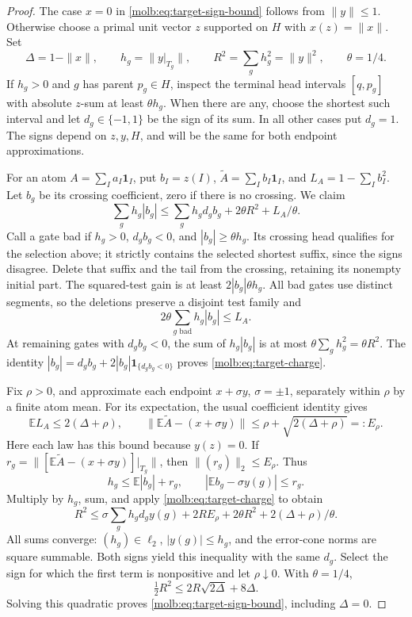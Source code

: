 \begin{proof}
The case \(x=0\) in \eqref{molb:eq:target-sign-bound} follows from
\(\|y\|\le1\).  Otherwise choose a primal unit vector \(z\)
supported on \(H\) with \(x(z)=\|x\|\).  Set
\[
 \Delta=1-\|x\|,\qquad h_g=\|y|_{T_g}\|,\qquad
 R^2=\sum_gh_g^2=\|y\|^2,\qquad\theta=1/4.
\]
If \(h_g>0\) and \(g\) has parent \(p_g\in H\), inspect the terminal
head intervals \([q,p_g]\) with absolute \(z\)-sum at least
\(\theta h_g\).  When there are any, choose the shortest such interval
and let \(d_g\in\{-1,1\}\) be the sign of its sum.  In all other cases
put \(d_g=1\).  The signs depend on \(z,y,H\), and will be the same
for both endpoint approximations.

For an atom \(A=\sum_Ia_I\mathbf1_I\), put \(b_I=z(I)\),
\(\widetilde A=\sum_Ib_I\mathbf1_I\), and
\(L_A=1-\sum_Ib_I^2\).  Let \(b_g\) be its crossing coefficient,
zero if there is no crossing.  We claim
\begin{equation}\label{molb:eq:target-charge}
 \sum_gh_g|b_g|
 \le\sum_gh_gd_gb_g+2\theta R^2+L_A/\theta.
\end{equation}
Call a gate bad if \(h_g>0\), \(d_gb_g<0\), and
\(|b_g|\ge\theta h_g\).  Its crossing head qualifies for the
selection above; it strictly contains the selected shortest suffix,
since the signs disagree.  Delete that suffix and the tail from the
crossing, retaining its nonempty initial part.  The squared-test gain
is at least \(2|b_g|\theta h_g\).  All bad gates use distinct
segments, so the deletions preserve a disjoint test family and
\[
 2\theta\sum_{g\text{ bad}}h_g|b_g|\le L_A.
\]
At remaining gates with \(d_gb_g<0\), the sum of \(h_g|b_g|\) is at
most \(\theta\sum_gh_g^2=\theta R^2\).  The identity
\(|b_g|=d_gb_g+2|b_g|\mathbf1_{\{d_gb_g<0\}}\) proves
\eqref{molb:eq:target-charge}.

Fix \(\rho>0\), and approximate each endpoint \(x+\sigma y\),
\(\sigma=\pm1\), separately within \(\rho\) by a finite atom mean.
For its expectation, the usual coefficient identity gives
\[
 \mathbb EL_A\le2(\Delta+\rho),\qquad
 \|\mathbb E\widetilde A-(x+\sigma y)\|
       \le\rho+\sqrt{2(\Delta+\rho)}=:E_\rho.
\]
Here each law has this bound because \(y(z)=0\).  If
\(r_g=\|[\mathbb E\widetilde A-(x+\sigma y)]|_{T_g}\|\), then
\(\|(r_g)\|_2\le E_\rho\).  Thus
\[
 h_g\le\mathbb E|b_g|+r_g,
 \qquad |\mathbb Eb_g-\sigma y(g)|\le r_g.
\]
Multiply by \(h_g\), sum, and apply
\eqref{molb:eq:target-charge} to obtain
\[
 R^2\le\sigma\sum_gh_gd_gy(g)+2RE_\rho
                     +2\theta R^2+2(\Delta+\rho)/\theta.
\]
All sums converge: \((h_g)\in\ell_2\), \(|y(g)|\le h_g\), and the
error-cone norms are square summable.  Both signs yield this inequality
with the same \(d_g\).  Select the sign for which the first term is
nonpositive and let \(\rho\downarrow0\).  With \(\theta=1/4\),
\[
 \tfrac12 R^2\le2R\sqrt{2\Delta}+8\Delta.
\]
Solving this quadratic proves \eqref{molb:eq:target-sign-bound}, including
\(\Delta=0\).


\end{proof}
